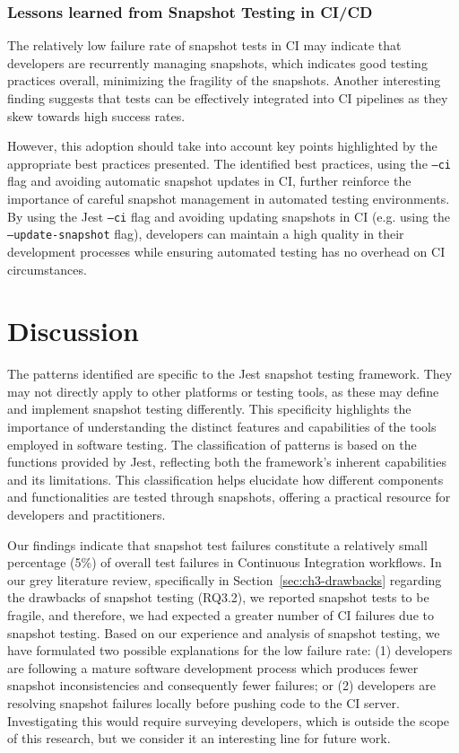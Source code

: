 \documentclass[
	msc, %
	english %
]{../ppgccufmg}
\begin{document}
        \subsubsection{Lessons learned from Snapshot Testing in CI/CD}
        
        The relatively low failure rate of snapshot tests in CI may indicate that developers are recurrently managing snapshots, which indicates good testing practices overall, minimizing the fragility of the snapshots. Another interesting finding suggests that tests can be effectively integrated into CI pipelines as they skew towards high success rates.
        
        However, this adoption should take into account key points highlighted by the appropriate best practices presented. The identified best practices, using the \texttt{--ci} flag and avoiding automatic snapshot updates in CI, further reinforce the importance of careful snapshot management in automated testing environments. By using the Jest \texttt{--ci} flag and avoiding updating snapshots in CI (e.g. using the \texttt{--update-snapshot} flag), developers can maintain a high quality in their development processes while ensuring automated testing has no overhead on CI circumstances.
        
        \section{Discussion}\label{sec:ch4-discussion}
        
        The patterns identified are specific to the Jest snapshot testing framework. They may not directly apply to other platforms or testing tools, as these may define and implement snapshot testing differently. This specificity highlights the importance of understanding the distinct features and capabilities of the tools employed in software testing. The classification of patterns is based on the functions provided by Jest, reflecting both the framework’s inherent capabilities and its limitations. This classification helps elucidate how different components and functionalities are tested through snapshots, offering a practical resource for developers and practitioners.

        Our findings indicate that snapshot test failures constitute a relatively small percentage (5\%) of overall test failures in Continuous Integration workflows. In our grey literature review, specifically in Section~\ref{sec:ch3-drawbacks} regarding the drawbacks of snapshot testing (RQ3.2), we reported snapshot tests to be fragile, and therefore, we had expected a greater number of CI failures due to snapshot testing. Based on our experience and analysis of snapshot testing, we have formulated two possible explanations for the low failure rate: (1) developers are following a mature software development process which produces fewer snapshot inconsistencies and consequently fewer failures; or (2) developers are resolving snapshot failures locally before pushing code to the CI server. Investigating this would require surveying developers, which is outside the scope of this research, but we consider it an interesting line for future work.
\end{document}
